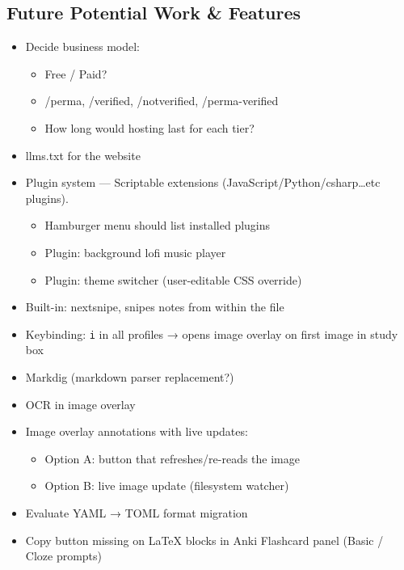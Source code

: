 \documentclass[14pt]{article}
\begin{document}
\newpage
\subsection{Future Potential Work \& Features}
\label{sec:org6a281ba}
\begin{itemize}
\item Decide business model:
\begin{itemize}
\item Free / Paid?
\item /perma, /verified, /notverified, /perma-verified
\item How long would hosting last for each tier?
\end{itemize}
\item llms.txt for the website
\item Plugin system — Scriptable extensions (JavaScript/Python/csharp\ldots{}etc plugins).
\begin{itemize}
\item Hamburger menu should list installed plugins
\item Plugin: background lofi music player
\item Plugin: theme switcher (user-editable CSS override)
\end{itemize}
\item Built-in: nextsnipe, snipes notes from within the file
\item Keybinding: \texttt{i} in all profiles → opens image overlay on first image in study box
\item Markdig (markdown parser replacement?)
\item OCR in image overlay
\item Image overlay annotations with live updates:
\begin{itemize}
\item Option A: button that refreshes/re-reads the image
\item Option B: live image update (filesystem watcher)
\end{itemize}
\item Evaluate YAML → TOML format migration
\item Copy button missing on \LaTeX{} blocks in Anki Flashcard panel (Basic / Cloze prompts)
\end{itemize}
\newpage
\end{document}
